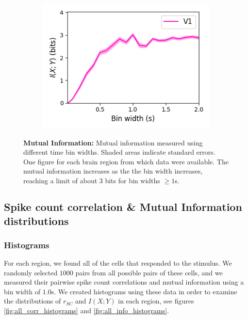 \documentclass[a4paper,12pt]{article}
\theoremstyle{definition}
\begin{document}
\begin{figure}[p]
\begin{subfigure}{0.5\textwidth}
    \includegraphics[width=\textwidth]{figures/linear_mutual_info_by_bin_width_v1_6.png}
  \end{subfigure}
  \caption{\textbf{Mutual Information:} Mutual information measured using different time bin widths. Shaded areas indicate standard errors. One figure for each brain region from which data were available. The mutual information increases as the the bin width increases, reaching a limit of about $3$ bits for bin widths $\geq 1$s.}
  \label{fig:linear_bin_width_vs_mutual_information_by_region}
\end{figure}

\subsection{Spike count correlation \& Mutual Information distributions}

\subsubsection{Histograms}\label{sec:histograms}
For each region, we found all of the cells that responded to the stimulus. We randomly selected $1000$ pairs from all possible pairs of these cells, and we measured their pairwise  spike count correlations and mutual information using a bin width of $1.0$s. We created histograms using these data in order to examine the distributions of $r_{SC}$ and $I(X;Y)$ in each region, see figures \ref{fig:all_corr_histograms} and \ref{fig:all_info_histograms}.
\end{document}
